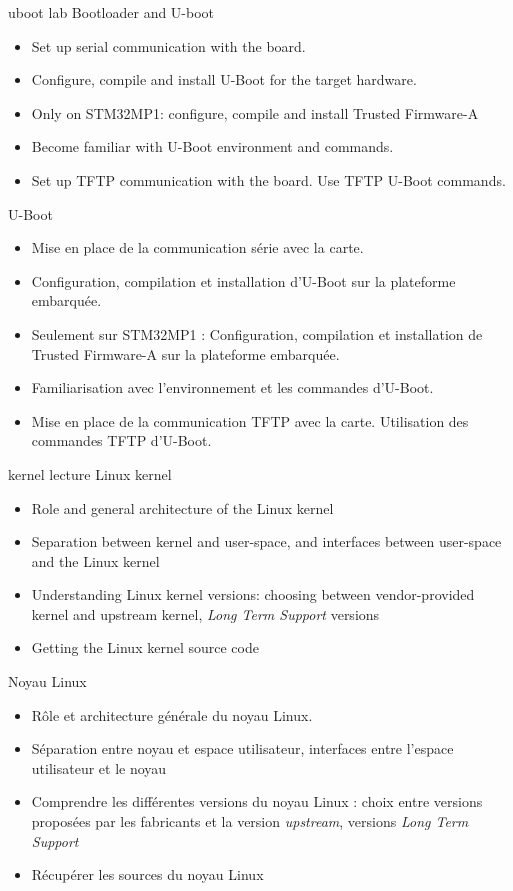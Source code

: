 {uboot}
{lab}
{Bootloader and U-boot}
{
  \begin{itemize}
  \item Set up serial communication with the board.
  \item Configure, compile and install U-Boot for the target hardware.
  \item Only on STM32MP1: configure, compile and install Trusted Firmware-A
  \item Become familiar with U-Boot environment and commands.
  \item Set up TFTP communication with the board. Use TFTP U-Boot
    commands.
  \end{itemize}
}
{U-Boot}
{
  \begin{itemize}
  \item Mise en place de la communication série avec la carte.
  \item Configuration, compilation et installation d'U-Boot sur la
    plateforme embarquée.
  \item Seulement sur STM32MP1 : Configuration, compilation et
    installation de Trusted Firmware-A sur la plateforme embarquée.
  \item Familiarisation avec l'environnement et les commandes
    d'U-Boot.
  \item Mise en place de la communication TFTP avec la carte.
    Utilisation des commandes TFTP d'U-Boot.
  \end{itemize}
}
{kernel}
{lecture}
{Linux kernel}
{
  \begin{itemize}
  \item Role and general architecture of the Linux kernel
  \item Separation between kernel and user-space, and interfaces
    between user-space and the Linux kernel
  \item Understanding Linux kernel versions: choosing between
    vendor-provided kernel and upstream kernel, {\em Long Term
      Support} versions
  \item Getting the Linux kernel source code
  \end{itemize}
}
{Noyau Linux}
{
  \begin{itemize}
  \item Rôle et architecture générale du noyau Linux.
  \item Séparation entre noyau et espace utilisateur, interfaces entre
    l'espace utilisateur et le noyau
  \item Comprendre les différentes versions du noyau Linux : choix
    entre versions proposées par les fabricants et la version {\em
      upstream}, versions {\em Long Term Support}
  \item Récupérer les sources du noyau Linux
  \end{itemize}
}
